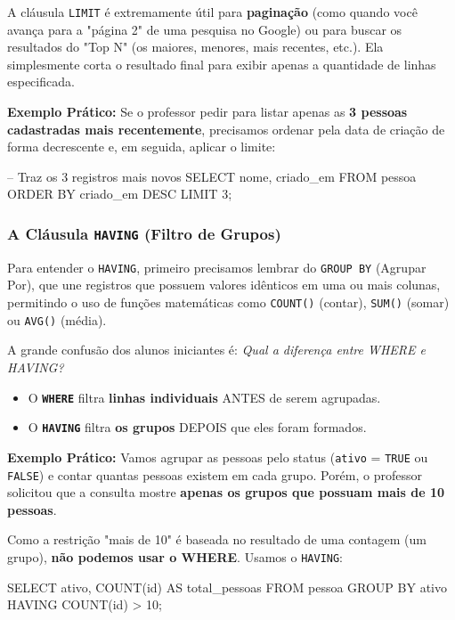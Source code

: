 A cláusula \texttt{LIMIT} é extremamente útil para \textbf{paginação} (como quando você avança para a "página 2" de uma pesquisa no Google) ou para buscar os resultados do "Top N" (os maiores, menores, mais recentes, etc.). Ela simplesmente corta o resultado final para exibir apenas a quantidade de linhas especificada.


\textbf{Exemplo Prático:} Se o professor pedir para listar apenas as \textbf{3 pessoas cadastradas mais recentemente}, precisamos ordenar pela data de criação de forma decrescente e, em seguida, aplicar o limite:

\begin{sqlcode}
-- Traz os 3 registros mais novos
SELECT nome, criado_em
FROM pessoa
ORDER BY criado_em DESC
LIMIT 3;
\end{sqlcode}

\subsubsection{A Cláusula \texttt{HAVING} (Filtro de Grupos)}

Para entender o \texttt{HAVING}, primeiro precisamos lembrar do \texttt{GROUP BY} (Agrupar Por), que une registros que possuem valores idênticos em uma ou mais colunas, permitindo o uso de funções matemáticas como \texttt{COUNT()} (contar), \texttt{SUM()} (somar) ou \texttt{AVG()} (média).

A grande confusão dos alunos iniciantes é: \textit{Qual a diferença entre WHERE e HAVING?}
\begin{itemize}
    \item O \textbf{\texttt{WHERE}} filtra \textbf{linhas individuais} ANTES de serem agrupadas.
    \item O \textbf{\texttt{HAVING}} filtra \textbf{os grupos} DEPOIS que eles foram formados.
\end{itemize}

\textbf{Exemplo Prático:} Vamos agrupar as pessoas pelo status (\texttt{ativo} = \texttt{TRUE} ou \texttt{FALSE}) e contar quantas pessoas existem em cada grupo. Porém, o professor solicitou que a consulta mostre \textbf{apenas os grupos que possuam mais de 10 pessoas}. 

Como a restrição "mais de 10" é baseada no resultado de uma contagem (um grupo), \textbf{não podemos usar o WHERE}. Usamos o \texttt{HAVING}:

\begin{sqlcode}
SELECT ativo, COUNT(id) AS total_pessoas
FROM pessoa
GROUP BY ativo
HAVING COUNT(id) > 10;
\end{sqlcode}

